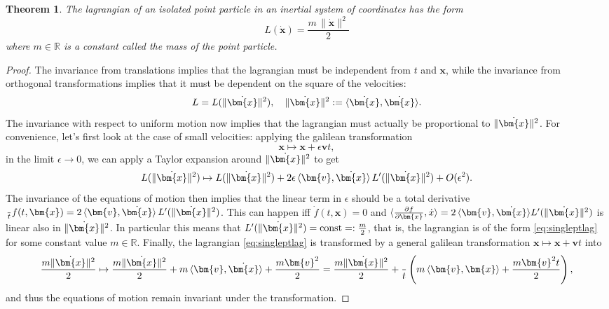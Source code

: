 \documentclass[english,fontsize=11pt,paper=a5,oneside]{scrbook}
\newcommand{\R}{\mathbb{R}}
\newcommand{\bx}{\bm{x}}
\newcommand{\lag}{\langle}
\newcommand{\rag}{\rangle}
\let\d\relax
\newcommand{\d}{\mathrm{d}}
\newtheorem{theorem}{Theorem}[chapter]
\theoremstyle{definition}
\begin{document}
\begin{theorem}
  The lagrangian of an isolated point particle in an inertial system of coordinates has the form
  \begin{equation}\label{eq:singleptlag}
    L(\dot{\bm{x}}) = \frac{m\,\|\dot{\bm{x}}\|^2}2
  \end{equation}
  where $m\in\R$ is a constant called the \emph{mass} of the point particle.
\end{theorem}
\begin{proof}
  The invariance from translations implies that the lagrangian must be independent from $t$ and $\bx$, while the invariance from orthogonal transformations implies that it must be dependent on the square of the velocities:
  \begin{equation}
    L = L(\|\dot\bx\|^2), \quad \|\dot\bx\|^2 := \lag\dot \bx, \dot \bx\rag.
  \end{equation}
  The invariance with respect to uniform motion now implies that the lagrangian must actually be proportional to $\|\dot\bx\|^2$.
  For convenience, let's first look at the case of small velocities: applying the galilean transformation
  \begin{equation}
    \bx \mapsto \bx + \epsilon \bm{v}t,
  \end{equation}
  in the limit $\epsilon \to 0$, we can apply a Taylor expansion around $\|\dot\bx\|^2$ to get
  \begin{equation}
    L(\|\dot\bx\|^2) \mapsto L(\|\dot\bx\|^2) + 2\epsilon\,\lag\bm{v}, \dot\bx\rag\,L'(\|\dot\bx\|^2) + O(\epsilon^2).
  \end{equation}
  The invariance of the equations of motion then implies that the linear term in $\epsilon$ should be a total derivative $\frac{\d }{\d t} f(t, \bx) = 2\,\lag\bm{v}, \dot\bx\rag\,L'(\|\dot\bx\|^2)$.
  This can happen iff $\dot f(t, \bx) = 0$ and $\lag \frac{\partial f}{\partial \bx}, \dot x\rag  = 2\,\lag\bm{v}, \dot\bx\rag L'(\|\dot\bx\|^2)$ is linear also in $\|\dot\bx\|^2$.
  In particular this means that $L'(\|\dot\bx\|^2) = \mathrm{const} =: \frac{m}2$, that is, the lagrangian is of the form \eqref{eq:singleptlag} for some constant value $m\in\R$.
  Finally, the lagrangian \eqref{eq:singleptlag} is transformed by a general galilean transformation $\bx \mapsto \bx + \bm{v}t$ into
  \begin{equation}
    \frac{m \|\dot\bx\|^2}2 \mapsto
    \frac{m \|\dot\bx\|^2}2 + m\,\lag\bm{v},\dot\bx\rag + \frac{m \bm{v}^2}2
    = \frac{m \|\dot\bx\|^2}2 + \frac{\d }{\d t}\left(m\,\lag\bm{v},\bx\rag + \frac{m \bm{v}^2 t}2\right),
  \end{equation}
  and thus the equations of motion remain invariant under the transformation.
\end{proof}
\end{document}
